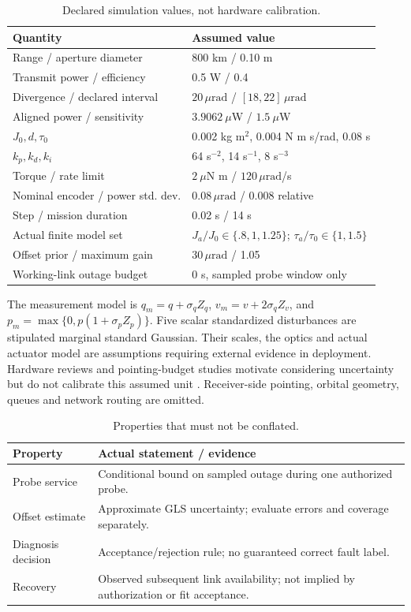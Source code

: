 \documentclass[10pt,journal]{IEEEtran}
\newcommand{\um}{\,\mu\mathrm{rad}}
\begin{document}
\begin{table}[t]
\caption{Declared simulation values, not hardware calibration.}
\centering\footnotesize
\begin{tabular}{@{}p{}p{}@{}}\toprule
Quantity & Assumed value\\\midrule
Range / aperture diameter & 800 km / 0.10 m\\
Transmit power / efficiency & 0.5 W / 0.4\\
Divergence / declared interval & $20\um$ / $[18,22]\um$\\
Aligned power / sensitivity & $3.9062~\mu$W / $1.5~\mu$W\\
$J_0,d,\tau_0$ & 0.002 kg m$^2$, 0.004 N m s/rad, 0.08 s\\
$k_p,k_d,k_i$ & 64 s$^{-2}$, 14 s$^{-1}$, 8 s$^{-3}$\\
Torque / rate limit & $2~\mu$N m / $120\um$/s\\
Nominal encoder / power std. dev. & $0.08\um$ / 0.008 relative\\
Step / mission duration & 0.02 s / 14 s\\
Actual finite model set & $J_a/J_0\in\{.8,1,1.25\}$; $\tau_a/\tau_0\in\{1,1.5\}$\\
Offset prior / maximum gain & $30\um$ / 1.05\\
Working-link outage budget & 0 s, sampled probe window only\\\bottomrule
\end{tabular}
\label{tab:model}
\end{table}

The measurement model is $q_m=q+\sigma_qZ_q$, $v_m=v+2\sigma_qZ_v$, and $p_m=\max\{0,p(1+\sigma_p Z_p)\}$. Five scalar standardized disturbances are stipulated marginal standard Gaussian. Their scales, the optics and actual actuator model are assumptions requiring external evidence in deployment. Hardware reviews and pointing-budget studies motivate considering uncertainty but do not calibrate this assumed unit \cite{actuators,baeck,nasa}. Receiver-side pointing, orbital geometry, queues and network routing are omitted.

\begin{table}[t]
\caption{Properties that must not be conflated.}
\footnotesize\centering
\begin{tabular}{@{}p{}p{}@{}}\toprule
Property & Actual statement / evidence\\\midrule
Probe service & Conditional bound on sampled outage during one authorized probe.\\
Offset estimate & Approximate GLS uncertainty; evaluate errors and coverage separately.\\
Diagnosis decision & Acceptance/rejection rule; no guaranteed correct fault label.\\
Recovery & Observed subsequent link availability; not implied by authorization or fit acceptance.\\\bottomrule
\end{tabular}
\label{tab:four}
\end{table}
\end{document}
